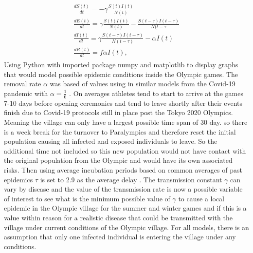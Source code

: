 \documentclass[12pt, oneside]{article}
\begin{document}
\begin{align}
 	\begin{split}
	\frac{dS(t)}{dt}=-{\gamma}\frac{S(t)I(t)}{N(t)}\\
	\frac{dE(t)}{dt}={\gamma}\frac{S(t)I(t)}{N(t)}-\frac{S(t-\tau)I(t-\tau)}{N(t-\tau}\\
	\frac{dI(t)}{dt} = \gamma\frac{S(t-\tau)I(t-\tau)}{N(t-\tau)}-{\alpha}I(t)\\
	\frac{dR(t)}{dt}=f{\alpha}I(t),
	\end{split}
\end{align}
Using Python with imported package numpy and matplotlib to display graphs that would model possible epidemic conditions inside the Olympic games. The removal rate $\alpha $ was based of values using in similar models from the Covid-19 pandemic with $\alpha = \frac{1}{6}$ \cite{ shapiro2021adaptive}. On averages athletes tend to start to arrive at the games 7-10 days before opening ceremonies and tend to leave shortly after their events finish due to Covid-19 protocols still in place post the Tokyo 2020 Olympics. Meaning the village can only have a largest possible time span of 30 day. so there is a week break for the turnover to Paralympics and therefore reset the initial population causing all infected and exposed individuals to leave. So the additional time not included so this new population would not have contact with the original population from the Olympic and would have its own associated risks. Then using average incubation periods based on common averages of past epidemics  $\tau$ is set to 2.9 as the average delay \cite{cori2012estimating}. The transmission constant $\gamma$ can vary by disease and the value of the transmission rate is now a possible variable of interest to see what is the minimum possible value of $\gamma$ to cause a local epidemic in the Olympic village for the summer and winter games and if this is a value within reason for a realistic disease that could be transmitted with the village under current conditions of the Olympic village. For all models, there is an assumption that only one infected individual is entering the village under any conditions.
\end{document}
